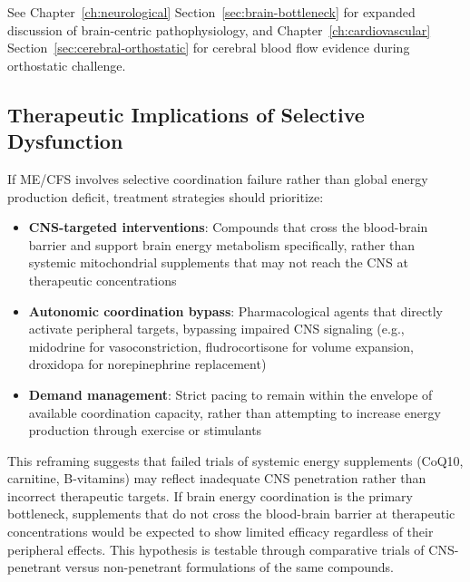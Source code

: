 See Chapter~\ref{ch:neurological} Section~\ref{sec:brain-bottleneck} for expanded discussion of brain-centric pathophysiology, and Chapter~\ref{ch:cardiovascular} Section~\ref{sec:cerebral-orthostatic} for cerebral blood flow evidence during orthostatic challenge.

\subsection{Therapeutic Implications of Selective Dysfunction}

If ME/CFS involves selective coordination failure rather than global energy production deficit, treatment strategies should prioritize:

\begin{itemize}
    \item \textbf{CNS-targeted interventions}: Compounds that cross the blood-brain barrier and support brain energy metabolism specifically, rather than systemic mitochondrial supplements that may not reach the CNS at therapeutic concentrations

    \item \textbf{Autonomic coordination bypass}: Pharmacological agents that directly activate peripheral targets, bypassing impaired CNS signaling (e.g., midodrine for vasoconstriction, fludrocortisone for volume expansion, droxidopa for norepinephrine replacement)

    \item \textbf{Demand management}: Strict pacing to remain within the envelope of available coordination capacity, rather than attempting to increase energy production through exercise or stimulants
\end{itemize}

\begin{speculation}
\label{spec:cns-penetration}
This reframing suggests that failed trials of systemic energy supplements (CoQ10, carnitine, B-vitamins) may reflect inadequate CNS penetration rather than incorrect therapeutic targets. If brain energy coordination is the primary bottleneck, supplements that do not cross the blood-brain barrier at therapeutic concentrations would be expected to show limited efficacy regardless of their peripheral effects. This hypothesis is testable through comparative trials of CNS-penetrant versus non-penetrant formulations of the same compounds.
\end{speculation}

